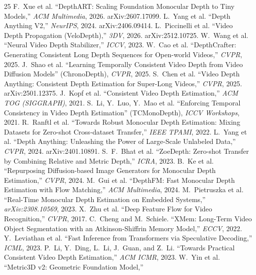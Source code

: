 \documentclass[10pt,twocolumn]{article}
\begin{document}
\begin{thebibliography}{25}\small
 F.~Xue et al.
``DepthART: Scaling Foundation Monocular Depth to Tiny Models,''
\emph{ACM Multimedia}, 2026. arXiv:2607.17099.
 L.~Yang et al.
``Depth Anything V2,'' \emph{NeurIPS}, 2024. arXiv:2406.09414.
 L.~Piccinelli et al. ``Video Depth Propagation
(VeloDepth),'' \emph{3DV}, 2026. arXiv:2512.10725.
 W.~Wang et al. ``Neural Video Depth Stabilizer,''
\emph{ICCV}, 2023.
 W.~Cao et al. ``DepthCrafter: Generating Consistent
Long Depth Sequences for Open-world Videos,'' \emph{CVPR}, 2025.
 J.~Shao et al. ``Learning Temporally Consistent Video
Depth from Video Diffusion Models'' (ChronoDepth), \emph{CVPR}, 2025.
 S.~Chen et al. ``Video Depth Anything: Consistent Depth
Estimation for Super-Long Videos,'' \emph{CVPR}, 2025. arXiv:2501.12375.
 J.~Kopf et al. ``Consistent Video Depth Estimation,''
\emph{ACM TOG (SIGGRAPH)}, 2021.
 S.~Li, Y.~Luo, Y.~Mao et al. ``Enforcing Temporal
Consistency in Video Depth Estimation'' (TCMonoDepth), \emph{ICCV Workshops},
2021.
 R.~Ranftl et al. ``Towards Robust Monocular Depth Estimation:
Mixing Datasets for Zero-shot Cross-dataset Transfer,'' \emph{IEEE TPAMI},
2022.
 L.~Yang et al. ``Depth Anything: Unleashing the Power of
Large-Scale Unlabeled Data,'' \emph{CVPR}, 2024. arXiv:2401.10891.
 S.~F.~Bhat et al. ``ZoeDepth: Zero-shot Transfer by
Combining Relative and Metric Depth,'' \emph{ICRA}, 2023.
 B.~Ke et al. ``Repurposing Diffusion-based Image
Generators for Monocular Depth Estimation,'' \emph{CVPR}, 2024.
 M.~Gui et al. ``DepthFM: Fast Monocular Depth Estimation
with Flow Matching,'' \emph{ACM Multimedia}, 2024.
 M.~Pietruszka et al. ``Real-Time Monocular Depth
Estimation on Embedded Systems,'' \emph{arXiv:2308.10569}, 2023.
 X.~Zhu et al. ``Deep Feature Flow for Video Recognition,''
\emph{CVPR}, 2017.
 C.~Cheng and M.~Schiele. ``XMem: Long-Term Video Object
Segmentation with an Atkinson-Shiffrin Memory Model,'' \emph{ECCV}, 2022.
 Y.~Leviathan et al. ``Fast Inference from Transformers via
Speculative Decoding,'' \emph{ICML}, 2023.
 P.~Li, Y.~Ding, L.~Li, J.~Guan, and Z.~Li. ``Towards
Practical Consistent Video Depth Estimation,'' \emph{ACM ICMR}, 2023.
 W.~Yin et al. ``Metric3D v2: Geometric Foundation Model,''

\end{thebibliography}
\end{document}

